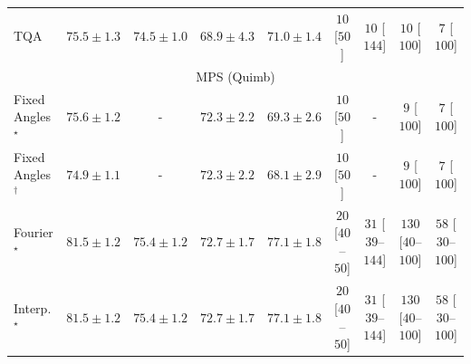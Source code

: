 \begin{tabular}{l|cccc|cccc|}
TQA & {\cellcolor[HTML]{8C74B5}} \color[HTML]{F1F1F1} $75.5\pm 1.3$ & {\cellcolor[HTML]{8C89C0}} \color[HTML]{F1F1F1} $74.5\pm 1.0$ & {\cellcolor[HTML]{CFDFED}} \color[HTML]{000000} $68.9\pm 4.3$ & {\cellcolor[HTML]{ACC6DF}} \color[HTML]{000000} $71.0\pm 1.4$ & {\cellcolor[HTML]{FFF7F3}} \color[HTML]{000000} $10$ [$50$] & {\cellcolor[HTML]{FFF7F3}} \color[HTML]{000000} $10$ [$144$] & {\cellcolor[HTML]{FFF7F3}} \color[HTML]{000000} $10$ [$100$] & {\cellcolor[HTML]{FFF7F3}} \color[HTML]{000000} $7$ [$100$] \\
\cline{1-9}
\multicolumn{9}{c}{\rule{0pt}{8pt}MPS (Quimb)} \\
\midrule
Fixed Angles$^\star$ & {\cellcolor[HTML]{EF7718}} \color[HTML]{F1F1F1} $75.6\pm 1.2$ & {\cellcolor[HTML]{000000}} \color[HTML]{F1F1F1} {\cellcolor{white}} \color{black} - & {\cellcolor[HTML]{FEBB47}} \color[HTML]{000000} $72.3\pm 2.2$ & {\cellcolor[HTML]{FEE89D}} \color[HTML]{000000} $69.3\pm 2.6$ & {\cellcolor[HTML]{FFF7F3}} \color[HTML]{000000} $10$ [$50$] & {\cellcolor[HTML]{000000}} \color[HTML]{F1F1F1} {\cellcolor{white}} \color{black} - & {\cellcolor[HTML]{FFF7F3}} \color[HTML]{000000} $9$ [$100$] & {\cellcolor[HTML]{FFF7F3}} \color[HTML]{000000} $7$ [$100$] \\
Fixed Angles$^\dagger$ & {\cellcolor[HTML]{F5851F}} \color[HTML]{F1F1F1} $74.9\pm 1.1$ & {\cellcolor[HTML]{000000}} \color[HTML]{F1F1F1} {\cellcolor{white}} \color{black} - & {\cellcolor[HTML]{FEBB47}} \color[HTML]{000000} $72.3\pm 2.2$ & {\cellcolor[HTML]{FFF4B6}} \color[HTML]{000000} $68.1\pm 2.9$ & {\cellcolor[HTML]{FFF7F3}} \color[HTML]{000000} $10$ [$50$] & {\cellcolor[HTML]{000000}} \color[HTML]{F1F1F1} {\cellcolor{white}} \color{black} - & {\cellcolor[HTML]{FFF7F3}} \color[HTML]{000000} $9$ [$100$] & {\cellcolor[HTML]{FFF7F3}} \color[HTML]{000000} $7$ [$100$] \\
Fourier$^\star$ & {\cellcolor[HTML]{712806}} \color[HTML]{F1F1F1} $81.5\pm 1.2$ & {\cellcolor[HTML]{F17B1A}} \color[HTML]{F1F1F1} $75.4\pm 1.2$ & {\cellcolor[HTML]{FEB23F}} \color[HTML]{000000} $72.7\pm 1.7$ & {\cellcolor[HTML]{D95B09}} \color[HTML]{F1F1F1} $77.1\pm 1.8$ & {\cellcolor[HTML]{FFF4F0}} \color[HTML]{000000} $20$ [$40$--$50$] & {\cellcolor[HTML]{FFF2EE}} \color[HTML]{000000} $31$ [$39$--$144$] & {\cellcolor[HTML]{FDDBD7}} \color[HTML]{000000} $130$ [$40$--$100$] & {\cellcolor[HTML]{FEECE9}} \color[HTML]{000000} $58$ [$30$--$100$] \\
Interp.$^\star$ & {\cellcolor[HTML]{712806}} \color[HTML]{F1F1F1} $81.5\pm 1.2$ & {\cellcolor[HTML]{F17B1A}} \color[HTML]{F1F1F1} $75.4\pm 1.2$ & {\cellcolor[HTML]{FEB23F}} \color[HTML]{000000} $72.7\pm 1.7$ & {\cellcolor[HTML]{D95B09}} \color[HTML]{F1F1F1} $77.1\pm 1.8$ & {\cellcolor[HTML]{FFF4F0}} \color[HTML]{000000} $20$ [$40$--$50$] & {\cellcolor[HTML]{FFF2EE}} \color[HTML]{000000} $31$ [$39$--$144$] & {\cellcolor[HTML]{FDDBD7}} \color[HTML]{000000} $130$ [$40$--$100$] & {\cellcolor[HTML]{FEECE9}} \color[HTML]{000000} $58$ [$30$--$100$] \\

\end{tabular}
